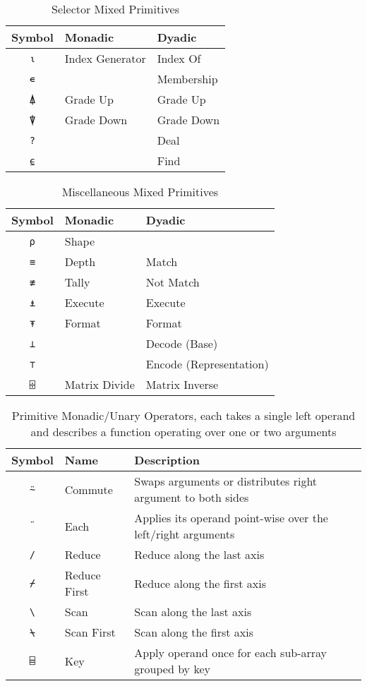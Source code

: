 \documentclass[numbers,preprint]{sigplanconf}
\begin{document}
\begin{table}
\centering
\begin{tabular}{cll}
\toprule
Symbol     & Monadic         & Dyadic \\
\midrule
\texttt{⍳} & Index Generator & Index Of \\
\texttt{∊} &                 & Membership \\
\texttt{⍋} & Grade Up        & Grade Up \\
\texttt{⍒} & Grade Down      & Grade Down \\
\texttt{?} &                 & Deal \\
\texttt{⍷} &                 & Find \\
\end{tabular}
\caption{Selector Mixed Primitives}
\label{tab:seltorprims}
\end{table}

\begin{table}
\centering
\begin{tabular}{cll}
\toprule
Symbol     & Monadic       & Dyadic \\
\midrule
\texttt{⍴} & Shape         & \\
\texttt{≡} & Depth         & Match \\
\texttt{≢} & Tally         & Not Match \\
\texttt{⍎} & Execute       & Execute \\
\texttt{⍕} & Format        & Format \\
\texttt{⊥} &               & Decode (Base) \\
\texttt{⊤} &               & Encode (Representation) \\
\texttt{⌹} & Matrix Divide & Matrix Inverse \\
\end{tabular}
\caption{Miscellaneous Mixed Primitives}
\label{tab:miscprims}
\end{table}

\begin{table*}
\centering
\begin{tabular}{cll}
\toprule
Symbol     & Name & Description \\
\midrule
\texttt{⍨} & Commute & Swaps arguments or distributes
 right argument to both sides \\
\texttt{¨} & Each & Applies its operand point-wise over the left/right
 arguments \\
\texttt{/} & Reduce & Reduce along the last axis \\
\texttt{⌿} & Reduce First & Reduce along the first axis \\
\texttt{\textbackslash} & Scan & Scan along the last axis \\
\texttt{⍀} & Scan First & Scan along the first axis \\
\texttt{⌸} & Key & Apply operand once for each sub-array grouped by key \\
\end{tabular}
\caption{Primitive Monadic/Unary Operators, each takes a single left
operand and describes a function operating over one or two arguments}
\label{tab:adverbs}
\end{table*}
\end{document}
